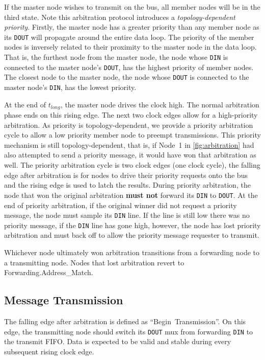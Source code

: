 If the master node wishes to transmit on the bus, all member nodes will be in
the third state. Note this arbitration protocol introduces a {\em
topology-dependent priority}. Firstly, the master node has a greater priority
than any member node as its {\tt DOUT} will propagate around the entire data
loop. The priority of the member nodes is inversely related to their proximity
to the master node in the data loop. That is, the furthest node from the
master node, the node whose {\tt DIN} is connected to the master node's
{\tt DOUT}, has the highest priority of member nodes. The closest node to the
master node, the node whose {\tt DOUT} is connected to the master node's
{\tt DIN}, has the lowest priority.

At the end of $t_{long}$, the master node drives the clock high. The
normal arbitration phase ends on this rising edge. The next two clock edges
allow for a high-priority arbitration. As \bus priority is topology-dependent,
we provide a priority arbitration cycle to allow a low priority member node to
preempt transmissions. This priority mechanism is still topology-dependent,
that is, if Node~1 in \cref{fig:arbitration} had also attempted to send
a priority message, it would have won that arbitration as well. The priority
arbitration cycle is two clock edges (one clock cycle), the falling edge after
arbitration is for nodes to drive their priority requests onto the bus and the
rising edge is used to latch the results.  During priority arbitration, the
node that won the original arbitration {\bf must not} forward its {\tt DIN} to
{\tt DOUT}. At the end of priority
arbitration, if the original winner did not request a priority message, the
node must sample its {\tt DIN} line. If the line is still low there was no
priority message, if the {\tt DIN} line has gone high, however, the node
has lost priority arbitration and must back off to allow the priority message
requester to transmit.

Whichever node ultimately won arbitration transitions from a forwarding node
to a transmitting node. Nodes that lost arbitration revert to
Forwarding.{\sc Address\_Match}.

\begin{figure}
  \figTimingInterrupt
\end{figure}

\subsection{Message Transmission}
\label{sec:protocol-transmission}
The falling edge after arbitration is defined as ``Begin~Transmission''. On this
edge, the transmitting node should switch its {\tt DOUT} mux from forwarding
{\tt DIN} to the transmit FIFO. Data is expected to be valid and stable during
every subsequent rising clock edge.

